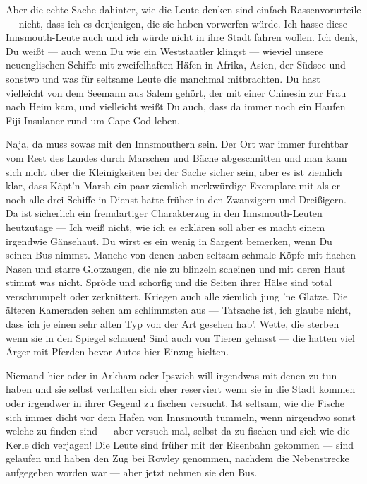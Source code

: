 Aber die echte Sache dahinter, wie die Leute denken sind einfach Rassenvorurteile --- nicht, dass ich es denjenigen, die sie haben vorwerfen würde. Ich hasse diese Innsmouth-Leute auch und ich würde nicht in ihre Stadt fahren wollen. Ich denk, Du weißt --- auch wenn Du wie ein Weststaatler klingst --- wieviel unsere neuenglischen Schiffe mit zweifelhaften Häfen in Afrika, Asien, der Südsee und sonstwo und was für seltsame Leute die manchmal mitbrachten. Du hast vielleicht von dem Seemann aus Salem gehört, der mit einer Chinesin zur Frau nach Heim kam, und vielleicht weißt Du auch, dass da immer noch ein Haufen Fiji-Insulaner rund um Cape Cod leben.

Naja, da muss sowas mit den Innsmouthern sein. Der Ort war immer furchtbar vom Rest des Landes durch Marschen und Bäche abgeschnitten und man kann sich nicht über die Kleinigkeiten bei der Sache sicher sein, aber es ist ziemlich klar, dass Käpt'n Marsh ein paar ziemlich merkwürdige Exemplare mit als er noch alle drei Schiffe in Dienst hatte früher in den Zwanzigern und Dreißigern. Da ist sicherlich ein fremdartiger Charakterzug in den Innsmouth-Leuten heutzutage --- Ich weiß nicht, wie ich es erklären soll aber es macht einem irgendwie Gänsehaut. Du wirst es ein wenig in Sargent bemerken, wenn Du seinen Bus nimmst. Manche von denen haben seltsam schmale Köpfe mit flachen Nasen und starre Glotzaugen, die nie zu blinzeln scheinen und mit deren Haut stimmt was nicht. Spröde und schorfig und die Seiten ihrer Hälse sind total verschrumpelt oder zerknittert. Kriegen auch alle ziemlich jung 'ne Glatze. Die älteren Kameraden sehen am schlimmsten aus --- Tatsache ist, ich glaube nicht, dass ich je einen sehr alten Typ von der Art gesehen hab'. Wette, die sterben wenn sie in den Spiegel schauen! Sind auch von Tieren gehasst --- die hatten viel Ärger mit Pferden bevor Autos hier Einzug hielten.

Niemand hier oder in Arkham oder Ipswich will irgendwas mit denen zu tun haben und sie selbst verhalten sich eher reserviert wenn sie in die Stadt kommen oder irgendwer in ihrer Gegend zu fischen versucht. Ist seltsam, wie die Fische sich immer dicht vor dem Hafen von Innsmouth tummeln, wenn nirgendwo sonst welche zu finden sind --- aber versuch mal, selbst da zu fischen und sieh wie die Kerle dich verjagen! Die Leute sind früher mit der Eisenbahn gekommen --- sind gelaufen und haben den Zug bei Rowley genommen, nachdem die Nebenstrecke aufgegeben worden war --- aber jetzt nehmen sie den Bus.

